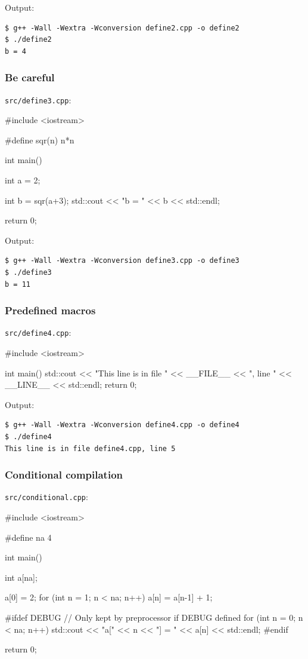 \documentclass[12pt,letterpaper,twoside]{article}
\begin{document}
Output:

\begin{verbatim}
$ g++ -Wall -Wextra -Wconversion define2.cpp -o define2
$ ./define2
b = 4
\end{verbatim}

\subsubsection{Be careful}
\texttt{src/define3.cpp}:

\begin{cpp}
#include <iostream>

#define sqr(n) n*n

int main() {
  int a = 2;

  int b = sqr(a+3);
  std::cout << "b = " << b << std::endl;

  return 0;
}
\end{cpp}

Output:

\begin{verbatim}
$ g++ -Wall -Wextra -Wconversion define3.cpp -o define3
$ ./define3
b = 11
\end{verbatim}

\subsubsection{Predefined macros}
\texttt{src/define4.cpp}:

\begin{cpp}
\#include <iostream>

int main() {
  std::cout << "This line is in file " << __FILE__
            << ", line " << __LINE__ << std::endl;
  return 0;
}
\end{cpp}

Output:

\begin{verbatim}
$ g++ -Wall -Wextra -Wconversion define4.cpp -o define4
$ ./define4
This line is in file define4.cpp, line 5
\end{verbatim}

\subsubsection{Conditional compilation}
\texttt{src/conditional.cpp}:

\begin{cpp}
#include <iostream>

#define na 4

int main() {
  int a[na];

  a[0] = 2;
  for (int n = 1; n < na; n++) a[n] = a[n-1] + 1;

#ifdef DEBUG
  // Only kept by preprocessor if DEBUG defined
  for (int n = 0; n < na; n++) {
    std::cout << "a[" << n << "] = " << a[n] << std::endl;
  }
#endif

  return 0;
}
\end{cpp}
\end{document}
